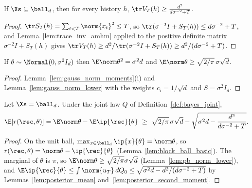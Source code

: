 \begin{lemma}\label{lem:trace_inv_lower}
\leanok
{}
If $\Xs\subseteq\ball_d$, then for every history $h$, $\tr V_T(h)\ge\frac{d^2}{d\sigma^{-2}+T}$.
\end{lemma}

\begin{proof}
\leanok
{}
$\tr S_T(h) = \sum_{t<T}\norm{x_t}^2\le T$, so $\tr(\sigma^{-2}I+S_T(h))\le d\sigma^{-2}+T$, and
Lemma~\ref{lem:trace_inv_amhm} applied to the positive definite matrix $\sigma^{-2}I+S_T(h)$
gives $\tr V_T(h)\ge d^2/\tr(\sigma^{-2}I+S_T(h))\ge d^2/(d\sigma^{-2}+T)$.
\end{proof}

\begin{lemma}\label{lem:pb_norm_lower}
\leanok
{}
If $\theta\sim\Normal(0,\sigma^2I_d)$ then $\E\norm\theta^2 = \sigma^2d$ and
$\E\norm\theta\ge\sqrt{2/\pi}\,\sigma\sqrt d$.
\end{lemma}

\begin{proof}
\leanok
{}
Lemma~\ref{lem:gauss_norm_moments}(i) and Lemma~\ref{lem:gauss_norm_lower} with the weights
$c_i = 1/\sqrt d$ and $S = \sigma^2I_d$.
\end{proof}

\begin{lemma}\label{lem:bayes_regret_ball}
\leanok
{}
Let $\Xs = \ball_d$. Under the joint law $Q$ of Definition~\ref{def:bayes_joint},
\[
  \E[r(\rec,\theta)] = \E\norm\theta-\E\ip{\rec}{\theta}
  \ \ge\ \sqrt{2/\pi}\,\sigma\sqrt d-\sqrt{\sigma^2d-\frac{d^2}{d\sigma^{-2}+T}} .
\]
\end{lemma}

\begin{proof}
\leanok
{}
On the unit ball, $\max_{x\in\ball_d}\ip{x}{\theta} = \norm\theta$, so
$r(\rec,\theta) = \norm\theta-\ip{\rec}{\theta}$ (Lemma~\ref{lem:block_ball_basic}). The marginal
of $\theta$ is $\pi$, so $\E\norm\theta \ge \sqrt{2/\pi}\sigma\sqrt d$
(Lemma~\ref{lem:pb_norm_lower}), and
$\E\ip{\rec}{\theta} \le \int\norm{u_T}\,dQ_0 \le \sqrt{\sigma^2d - d^2/(d\sigma^{-2}+T)}$
by Lemmas~\ref{lem:posterior_mean} and~\ref{lem:posterior_second_moment}.
\end{proof}

